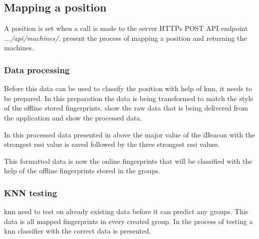 \subsection{Mapping a position}\label{sec:implServerSetPos}
A position is set when a call is made to the server HTTPs POST API endpoint \textit{.../api/machines/}.
 present the process of mapping a position and returning the machines.


\subsubsection{Data processing}\label{sec:implServerSetPosDataProcessing}
Before this data can be used to classify the position with help of \acrfull{knn}, it needs to be prepared.
In this preparation the data is being transformed to match the style of the offline stored fingerprints.
 show the raw data that is being delivered from the application and  show the processed data.



In this processed data presented in  above the major value of the iBeacon with the strongest \acrshort{rssi} value is saved followed by the three strongest \acrshort{rssi} values.

\bigskip

This formatted data is now the online fingerprints that will be classified with the help of the offline fingerprints stored in the groups.


\subsubsection{KNN testing}\label{sec:implServerSetPosKnnTesting}
\Acrshort{knn} need to test on already existing data before it can predict any groups. 
This data is all mapped fingerprints in every created group.
In  the process of testing a \acrshort{knn} classifier with the correct data is presented.


